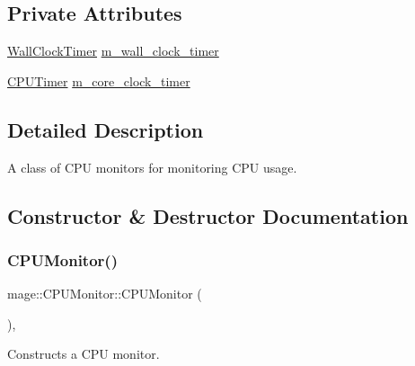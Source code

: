\subsection*{Private Attributes}
\begin{DoxyCompactItemize}
\item 
\mbox{\hyperlink{namespacemage_a06f4035ef59f07892e594bf1178a108a}{Wall\+Clock\+Timer}} \mbox{\hyperlink{classmage_1_1_c_p_u_monitor_ac1e3d7a7271515873a7a82a25eca4da2}{m\+\_\+wall\+\_\+clock\+\_\+timer}}
\item 
\mbox{\hyperlink{namespacemage_a1032d81f22079b7190cac3bf14136068}{C\+P\+U\+Timer}} \mbox{\hyperlink{classmage_1_1_c_p_u_monitor_a245b920ef7e6703087b47ad370cb3bbb}{m\+\_\+core\+\_\+clock\+\_\+timer}}
\end{DoxyCompactItemize}


\subsection{Detailed Description}
A class of C\+PU monitors for monitoring C\+PU usage. 

\subsection{Constructor \& Destructor Documentation}
\mbox{\label{classmage_1_1_c_p_u_monitor_ad41542b831ae42cf8dbb206a70535598}} 
\subsubsection{\texorpdfstring{C\+P\+U\+Monitor()}{CPUMonitor()}\hspace{0.1cm}{\footnotesize\ttfamily [1/3]}}
{\footnotesize\ttfamily mage\+::\+C\+P\+U\+Monitor\+::\+C\+P\+U\+Monitor (\begin{DoxyParamCaption}{ }\end{DoxyParamCaption})\hspace{0.3cm}{\ttfamily [default]}, {\ttfamily [noexcept]}}

Constructs a C\+PU monitor. \mbox{\label{classmage_1_1_c_p_u_monitor_a8d53a4b373c63d074fcb0cb969b3f7cb}} 
